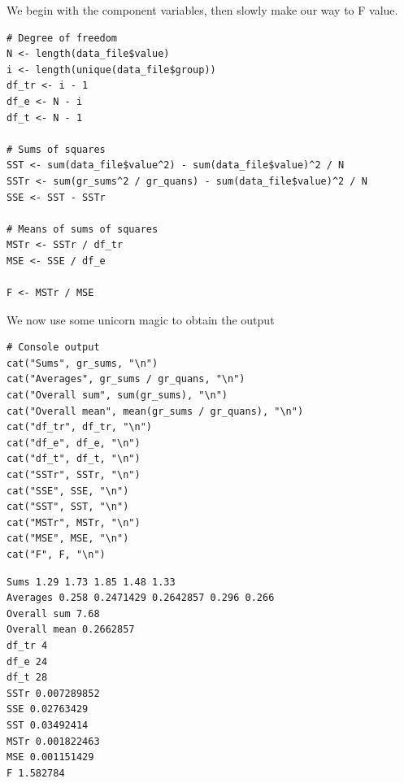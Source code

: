 \documentclass[a4paper]{article}
\numberwithin{equation}{section}
\begin{document}
We begin with the component variables, then slowly make our way to F value.
\begin{mdframed}[leftline=false,rightline=false,backgroundcolor=magenta!10,nobreak=true]
  \begin{verbatim}
# Degree of freedom
N <- length(data_file$value)
i <- length(unique(data_file$group))
df_tr <- i - 1
df_e <- N - i
df_t <- N - 1

# Sums of squares
SST <- sum(data_file$value^2) - sum(data_file$value)^2 / N
SSTr <- sum(gr_sums^2 / gr_quans) - sum(data_file$value)^2 / N
SSE <- SST - SSTr

# Means of sums of squares
MSTr <- SSTr / df_tr
MSE <- SSE / df_e

F <- MSTr / MSE
  \end{verbatim}
\end{mdframed}

We now use some unicorn magic to obtain the output
\begin{mdframed}[leftline=false,rightline=false,backgroundcolor=magenta!10,nobreak=true]
  \begin{verbatim}
# Console output
cat("Sums", gr_sums, "\n")
cat("Averages", gr_sums / gr_quans, "\n")
cat("Overall sum", sum(gr_sums), "\n")
cat("Overall mean", mean(gr_sums / gr_quans), "\n")
cat("df_tr", df_tr, "\n")
cat("df_e", df_e, "\n")
cat("df_t", df_t, "\n")
cat("SSTr", SSTr, "\n")
cat("SSE", SSE, "\n")
cat("SST", SST, "\n")
cat("MSTr", MSTr, "\n")
cat("MSE", MSE, "\n")
cat("F", F, "\n")
  \end{verbatim}
\end{mdframed}

\begin{mdframed}[leftline=false,rightline=false,backgroundcolor=teal!10,nobreak=true]
  \begin{verbatim}
Sums 1.29 1.73 1.85 1.48 1.33
Averages 0.258 0.2471429 0.2642857 0.296 0.266
Overall sum 7.68
Overall mean 0.2662857
df_tr 4
df_e 24
df_t 28
SSTr 0.007289852
SSE 0.02763429
SST 0.03492414
MSTr 0.001822463
MSE 0.001151429
F 1.582784
  \end{verbatim}
\end{mdframed}
\end{document}
